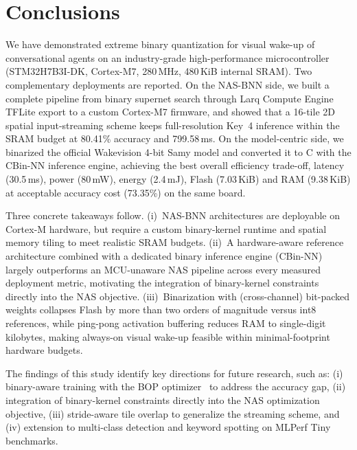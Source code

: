 \documentclass[conference]{IEEEtran}
\begin{document}
\section{Conclusions}
\label{sec:conclusion}

We have demonstrated extreme binary quantization for visual wake-up of conversational agents on an industry-grade high-performance microcontroller (STM32H7B3I-DK, Cortex-M7, 280\,MHz, 480\,KiB internal SRAM).
Two complementary deployments are reported.
On the NAS-BNN side, we built a complete pipeline from binary supernet search through Larq Compute Engine TFLite export to a custom Cortex-M7 firmware, and showed that a 16-tile 2D spatial input-streaming scheme keeps full-resolution Key~4 inference within the SRAM budget at 80.41\% accuracy and 799.58\,ms.
On the model-centric side, we binarized the official Wakevision 4-bit Samy model and converted it to C with the CBin-NN inference engine, achieving the best overall efficiency trade-off, latency (30.5\,ms), power (80\,mW), energy (2.4\,mJ), Flash (7.03\,KiB) and RAM (9.38\,KiB) at acceptable accuracy cost (73.35\%) on the same board.

Three concrete takeaways follow.
(i)~NAS-BNN architectures are deployable on Cortex-M hardware, but require a custom binary-kernel runtime and spatial memory tiling to meet realistic SRAM budgets.
(ii)~A hardware-aware reference architecture combined with a dedicated binary inference engine (CBin-NN) largely outperforms an MCU-unaware NAS pipeline across every measured deployment metric, motivating the integration of binary-kernel constraints directly into the NAS objective.
(iii)~Binarization with (cross-channel) bit-packed weights collapses Flash by more than two orders of magnitude versus int8 references, while ping-pong activation buffering reduces RAM to single-digit kilobytes, making always-on visual wake-up feasible within minimal-footprint hardware budgets.

The findings of this study identify key directions for future research, such as: (i) binary-aware training with the BOP optimizer~\cite{bannink2021larq} to address the accuracy gap, (ii) integration of binary-kernel constraints directly into the NAS optimization objective, (iii) stride-aware tile overlap to generalize the streaming scheme, and (iv) extension to multi-class detection and keyword spotting on MLPerf Tiny~\cite{banbury2021mlperftiny} benchmarks.

\balance


\end{document}
